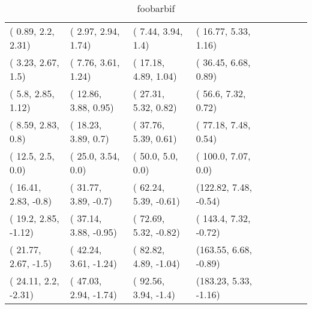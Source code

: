 \begin{sidewaystable}
  \centering
  \begin{tabular}{ l l l l l l l l l }
    (  0.89,    2.2,   2.31) & (  2.97,   2.94,   1.74) & (  7.44,   3.94,    1.4) & ( 16.77,   5.33,   1.16) \\
    (  3.23,   2.67,    1.5) & (  7.76,   3.61,   1.24) & ( 17.18,   4.89,   1.04) & ( 36.45,   6.68,   0.89) \\
    (   5.8,   2.85,   1.12) & ( 12.86,   3.88,   0.95) & ( 27.31,   5.32,   0.82) & (  56.6,   7.32,   0.72) \\
    (  8.59,   2.83,    0.8) & ( 18.23,   3.89,    0.7) & ( 37.76,   5.39,   0.61) & ( 77.18,   7.48,   0.54) \\
    (  12.5,    2.5,    0.0) & (  25.0,   3.54,    0.0) & (  50.0,    5.0,    0.0) & ( 100.0,   7.07,    0.0) \\
    ( 16.41,   2.83,   -0.8) & ( 31.77,   3.89,   -0.7) & ( 62.24,   5.39,  -0.61) & (122.82,   7.48,  -0.54) \\
    (  19.2,   2.85,  -1.12) & ( 37.14,   3.88,  -0.95) & ( 72.69,   5.32,  -0.82) & ( 143.4,   7.32,  -0.72) \\
    ( 21.77,   2.67,   -1.5) & ( 42.24,   3.61,  -1.24) & ( 82.82,   4.89,  -1.04) & (163.55,   6.68,  -0.89) \\
    ( 24.11,    2.2,  -2.31) & ( 47.03,   2.94,  -1.74) & ( 92.56,   3.94,   -1.4) & (183.23,   5.33,  -1.16) \\
  \end{tabular}
  \caption{foobarbif}
  \label{table:sn-approx-table}
\end{sidewaystable}
